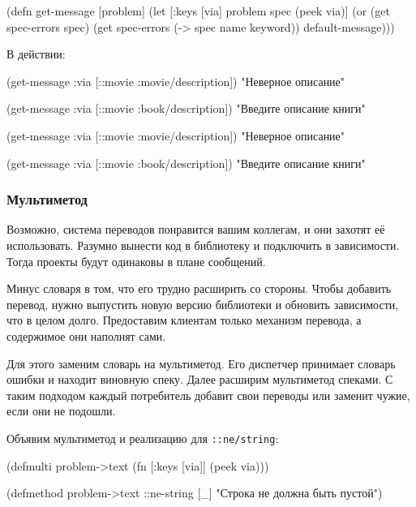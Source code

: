 \begin{clojure}
(defn get-message
  [problem]
  (let [{:keys [via]} problem
        spec (peek via)]
    (or (get spec-errors spec)
        (get spec-errors (-> spec name keyword))
        default-message)))
\end{clojure}

\fi

\noindent
В действии:

\ifnarrow

\begin{clojure}
(get-message
  {:via [::movie :movie/description]})
"Неверное описание"

(get-message
  {:via [::movie :book/description]})
"Введите описание книги"
\end{clojure}

\else

\begin{clojure}
(get-message {:via [::movie :movie/description]})
"Неверное описание"

(get-message {:via [::movie :book/description]})
"Введите описание книги"
\end{clojure}

\fi

\subsubsection*{Мультиметод}

Возможно, система переводов понравится вашим коллегам, и они захотят её
использовать. Разумно вынести код в библиотеку и подключить в зависимости. Тогда
проекты будут одинаковы в плане сообщений.

Минус словаря в том, что его трудно расширить со стороны. Чтобы добавить
перевод, нужно выпустить новую версию библиотеки и обновить зависимости, что в
целом долго. Предоставим клиентам только механизм перевода, а содержимое они
наполнят сами.

Для этого заменим словарь на мультиметод. Его диспетчер принимает словарь ошибки
и находит виновную спеку. Далее расширим мультиметод спеками. С таким подходом
каждый потребитель добавит свои переводы или заменит чужие, если они не подошли.

Объявим мультиметод и реализацию для \texttt{::ne\-/string}:


\begin{clojure}
(defmulti problem->text
  (fn [{:keys [via]}]
    (peek via)))

(defmethod problem->text ::ne-string [_]
  "Строка не должна быть пустой")
\end{clojure}


